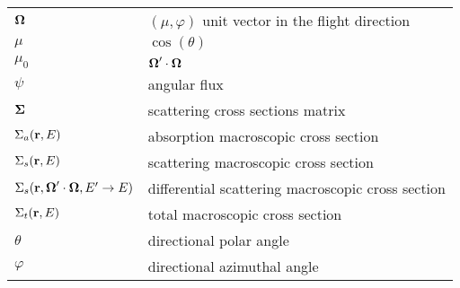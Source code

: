\begin{xtabular}{ll}
     $\boldsymbol{\Omega}$ & $(\mu,\varphi)$ unit vector in the flight direction \tabularnewline
     $\mu$ & $\cos(\theta)$ \tabularnewline
   $\mu_0$ & $\boldsymbol{\Omega}'\cdot \boldsymbol{\Omega}$ \tabularnewline
    $\psi$ & angular flux \tabularnewline
$\boldsymbol{\Sigma}$ & scattering cross sections matrix \tabularnewline
$\Sigma_a(\mathbf{r},E)$ & absorption macroscopic cross section \tabularnewline
$\Sigma_s(\mathbf{r},E)$ & scattering macroscopic cross section \tabularnewline
$\Sigma_s(\mathbf{r},\boldsymbol{\Omega}'\cdot\boldsymbol{\Omega},E'\rightarrow E)$ & differential scattering macroscopic 
  cross section \tabularnewline
$\Sigma_t(\mathbf{r},E)$ & total macroscopic cross section \tabularnewline
  $\theta$ & directional polar angle \tabularnewline
 $\varphi$ & directional azimuthal angle \tabularnewline
\end{xtabular}

\pagebreak{}
